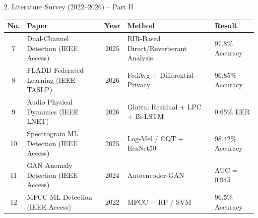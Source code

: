 \documentclass[10pt, aspectratio=169]{beamer}
\begin{document}
\begin{frame}{2. Literature Survey (2022--2026) -- Part II}

\small
\renewcommand{\arraystretch}{1.6}

\begin{center}
\begin{tabular}{|c|p{3.3cm}|c|p{3.7cm}|p{2.6cm}|}
\hline
\textbf{No.} &
\textbf{Paper} &
\textbf{Year} &
\textbf{Method} &
\textbf{Result} \\
\hline

7 &
Dual-Channel Detection (IEEE Access) &
2025 &
RIR-Based Direct/Reverberant Analysis &
97.8\% Accuracy \\
\hline

8 &
FLADD Federated Learning (IEEE TASLP) &
2026 &
FedAvg + Differential Privacy &
96.85\% Accuracy \\
\hline

9 &
Audio Physical Dynamics (IEEE LNET) &
2026 &
Glottal Residual + LPC + Bi-LSTM &
0.65\% EER \\
\hline

10 &
Spectrogram ML Detection (IEEE Access) &
2025 &
Log-Mel / CQT + ResNet50 &
98.42\% Accuracy \\
\hline

11 &
GAN Anomaly Detection (IEEE Access) &
2024 &
Autoencoder-GAN &
AUC = 0.945 \\
\hline

12 &
MFCC ML Detection (IEEE Access) &
2022 &
MFCC + RF / SVM &
96.5\% Accuracy \\
\hline

\end{tabular}
\end{center}

\end{frame}

\end{document}
